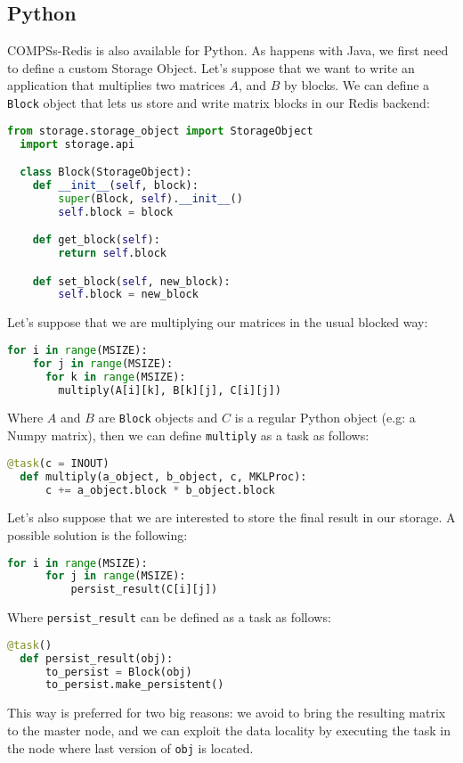 \documentclass{article}
\begin{document}
  \subsection{Python}
  COMPSs-Redis is also available for Python. As happens with Java, we first need to define a custom Storage Object. Let's suppose that we want to write an application that multiplies two matrices $A$, and $B$ by blocks. We can define a \verb|Block| object that lets us store and write matrix blocks in our Redis backend:
  \begin{lstlisting}[language=python]
  from storage.storage_object import StorageObject
  import storage.api

  class Block(StorageObject):
    def __init__(self, block):
        super(Block, self).__init__()
        self.block = block

    def get_block(self):
        return self.block

    def set_block(self, new_block):
        self.block = new_block
  \end{lstlisting}
  Let's suppose that we are multiplying our matrices in the usual blocked way:
  \begin{lstlisting}[language=python]
  for i in range(MSIZE):
    for j in range(MSIZE):
      for k in range(MSIZE):
        multiply(A[i][k], B[k][j], C[i][j])
  \end{lstlisting}
  Where $A$ and $B$ are \verb|Block| objects and $C$ is a regular Python object (e.g: a Numpy matrix), then we can define \verb|multiply| as a task as follows:
  \begin{lstlisting}[language=python]
  @task(c = INOUT)
  def multiply(a_object, b_object, c, MKLProc):
      c += a_object.block * b_object.block
  \end{lstlisting}
  Let's also suppose that we are interested to store the final result in our storage. A possible solution is the following:
  \begin{lstlisting}[language=python]
  for i in range(MSIZE):
      for j in range(MSIZE):
          persist_result(C[i][j])
  \end{lstlisting}
  Where \verb|persist_result| can be defined as a task as follows:
  \begin{lstlisting}[language=python]
  @task()
  def persist_result(obj):
      to_persist = Block(obj)
      to_persist.make_persistent()
  \end{lstlisting}
  This way is preferred for two big reasons: we avoid to bring the resulting matrix to the master node, and we can exploit the data locality by executing the task in the node where last version of \verb|obj| is located.
  
\end{document}
